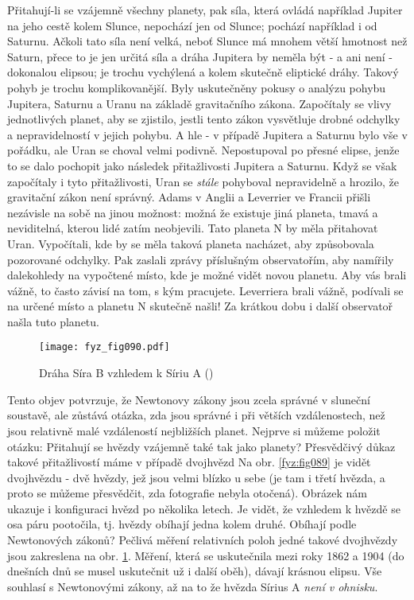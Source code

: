    Při\-ta\-hují-li se vzájemně všechny planety, pak síla, která ovládá například Jupiter na jeho 
    cestě kolem Slunce, nepochází jen od Slunce; pochází například i od Saturnu. Ačkoli tato síla 
    není velká, neboť Slunce má mnohem větší hmotnost než Saturn, přece to je jen určitá síla a 
    dráha Jupitera by neměla být - a ani není - dokonalou elipsou; je trochu vychýlená a 
     kolem skutečně eliptické dráhy. Takový pohyb je trochu komplikovanější. Byly 
    uskutečněny pokusy o analýzu pohybu Jupitera, Saturnu a Uranu na základě gravitačního zákona. 
    Započítaly se vlivy jednotlivých planet, aby se zjistilo, jestli tento zákon vysvětluje drobné 
    odchylky a nepravidelností v jejich pohybu. A hle - v případě Jupitera a Saturnu bylo vše v 
    pořádku, ale Uran se choval velmi podivně. Nepostupoval po přesné elipse, jenže to se dalo 
    pochopit jako následek přitažlivosti Jupitera a Saturnu. Když se však započítaly i tyto 
    přitažlivosti, Uran se \emph{stále} pohyboval nepravidelně a hrozilo, že gravitační zákon není 
    správný. Adams v Anglii a Leverrier ve Francii přišli nezávisle na sobě na jinou možnost: možná 
    že existuje jiná planeta, tmavá a neviditelná, kterou lidé zatím neobjevili. Tato planeta N by 
    měla přitahovat Uran. Vypočítali, kde by se měla taková planeta nacházet, aby způsobovala 
    pozorované odchylky. Pak zaslali zprávy příslušným observatořím, aby namířily dalekohledy na 
    vypočtené místo, kde je možné vidět novou planetu. Aby vás brali vážně, to často závisí na tom, 
    s kým pracujete. Leverriera brali vážně, podívali se na určené místo a planetu N skutečně 
    našli! Za krátkou dobu i další observatoř našla tuto planetu.

    \begin{figure}[ht!]  %
      \centering
      \texttt{[image: fyz\_fig090.pdf]}
      \caption{Dráha Síra B vzhledem k Síriu A (\cite[s.~99]{Feynman01})}
      \label{fyz:fig090}
    \end{figure}

    Tento objev potvrzuje, že Newtonovy zákony jsou zcela správné v sluneční soustavě, ale zůstává 
    otázka, zda jsou správné i při větších vzdálenostech, než jsou relativně malé vzdáleností 
    nejbližších planet. Nejprve si můžeme položit otázku: Přitahují se hvězdy vzájemně také tak 
    jako planety? Přesvědčivý důkaz takové přitažlivostí máme v případě dvojhvězd Na obr. 
    \ref{fyz:fig089} je vidět dvojhvězdu - dvě hvězdy, jež jsou velmi blízko u sebe (je tam i třetí 
    hvězda, a proto se můžeme přesvědčit, zda fotografie nebyla otočená). Obrázek nám ukazuje i 
    konfiguraci hvězd po několika letech. Je vidět, že vzhledem k  hvězdě se osa páru 
    pootočila, tj. hvězdy obíhají jedna kolem druhé. Obíhají podle Newtonových zákonů? Pečlivá 
    měření relativních poloh jedné takové dvojhvězdy jsou zakreslena na obr. \ref{fyz:fig090}. 
    Měření, která se uskutečnila mezi roky \num{1862} a \num{1904} (do dnešních dnů se musel 
    uskutečnit už i další oběh), dávají krásnou elipsu. Vše souhlasí s Newtonovými zákony, až na to 
    že hvězda Sírius A \emph{není v ohnisku}.  

